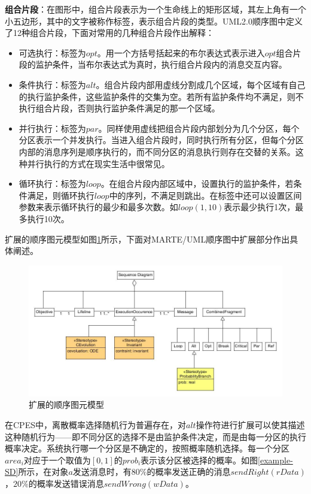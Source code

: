	\textbf{组合片段}：在图形中，组合片段表示为一个生命线上的矩形区域，其左上角有一个小五边形，其中的文字被称作标签，表示组合片段的类型。UML2.0顺序图中定义了12种组合片段，下面对常用的几种组合片段作出解释：
	\begin{itemize}
	\item 可选执行：标签为$opt$。用一个方括号括起来的布尔表达式表示进入$opt$组合片段的监护条件，当布尔表达式为真时，执行组合片段内的消息交互内容。
	\item 条件执行：标签为$alt$。组合片段内部用虚线分割成几个区域，每个区域有自己的执行监护条件，这些监护条件的交集为空。若所有监护条件均不满足，则不执行组合片段，否则执行监护条件满足的那一个区域。
	\item 并行执行：标签为$par$。同样使用虚线把组合片段内部划分为几个分区，每个分区表示一个并发执行。当进入组合片段时，同时执行所有分区，但每个分区内部的消息序列是顺序执行的，而不同分区的消息执行则存在交替的关系。这种并行执行的方式在现实生活中很常见。
	\item 循环执行：标签为$loop$。在组合片段内部区域中，设置执行的监护条件，若条件满足，则循环执行$loop$中的序列，不满足则跳出。在标签中还可以设置区间参数来表示循环执行的最少和最多次数。如$loop(1,10)$表示最少执行1次，最多执行10次。
	\end{itemize}
	
	扩展的顺序图元模型如图\ref{metamodel-sequence}所示，下面对MARTE/UML顺序图中扩展部分作出具体阐述。
	
	\begin{figure}[!t]
	\centering
	\includegraphics[width=5in]{metamodel-SD.jpg}
	\caption{扩展的顺序图元模型}
	\label{metamodel-sequence}
	\end{figure}
	
	在CPES中，离散概率选择随机行为普遍存在，对$alt$操作符进行扩展可以使其描述这种随机行为——即不同分区的选择不是由监护条件决定，而是由每一分区的执行概率决定。系统执行哪一个分区是不确定的，按照概率随机选择。每一个分区$area_{i}$对应于一个取值为$[0,1]$的$prob_{i}$表示该分区被选择的概率。如图\ref{example-SD}所示，在对象$a$发送消息时，有$80\%$的概率发送正确的消息$sendRight(rData)$，$20\%$的概率发送错误消息$sendWrong(wData)$。
	
